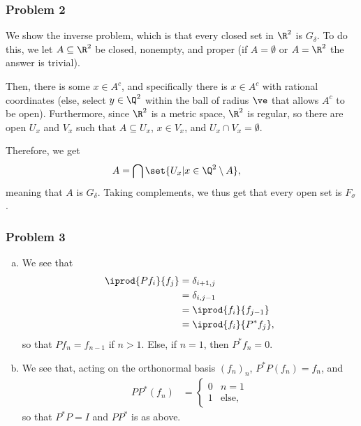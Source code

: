 \documentclass[10pt]{mypackage}
\begin{document}
\subsubsection{Problem 2}%
We show the inverse problem, which is that every closed set in $\R^2$ is $G_{\delta}$. To do this, we let $A\subseteq \R^2$ be closed, nonempty, and proper (if $A = \emptyset$ or $A = \R^2$ the answer is trivial).\newline

Then, there is some $x\in A^{c}$, and specifically there is $x\in A^{c}$ with rational coordinates (else, select $y\in \Q^2$ within the ball of radius $\ve$ that allows $A^{c}$ to be open). Furthermore, since $\R^2$ is a metric space, $\R^2$ is regular, so there are open $U_{x}$ and $V_x$ such that $A\subseteq U_x$, $x\in V_x$, and $U_x\cap V_x = \emptyset$.\newline

Therefore, we get
\begin{align*}
  A &= \bigcap \set{U_x | x\in \Q^2\setminus A},
\end{align*}
meaning that $A$ is $G_{\delta}$. Taking complements, we thus get that every open set is $F_{\sigma}$.
\subsubsection{Problem 3}%
\begin{enumerate}[(a)]
  \item We see that
    \begin{align*}
      \iprod{Pf_i}{f_j} &= \delta_{i+1,j}\\
                        &= \delta_{i,j-1}\\
                        &= \iprod{f_i}{f_{j-1}}\\
                        &= \iprod{f_i}{P^{\ast}f_j},
    \end{align*}
    so that $Pf_n = f_{n-1}$ if $n > 1$. Else, if $n = 1$, then $P^{\ast}f_n = 0$.
  \item We see that, acting on the orthonormal basis $\left( f_n \right)_n$, $P^{\ast}P\left( f_n \right) = f_n$, and
    \begin{align*}
      PP^{\ast}\left( f_n \right) &= \begin{cases}
        0 & n = 1\\
        1 & \text{else},
      \end{cases}
    \end{align*}
    so that $P^{\ast}P = I$ and $PP^{\ast}$ is as above.
\end{enumerate}
\end{document}
